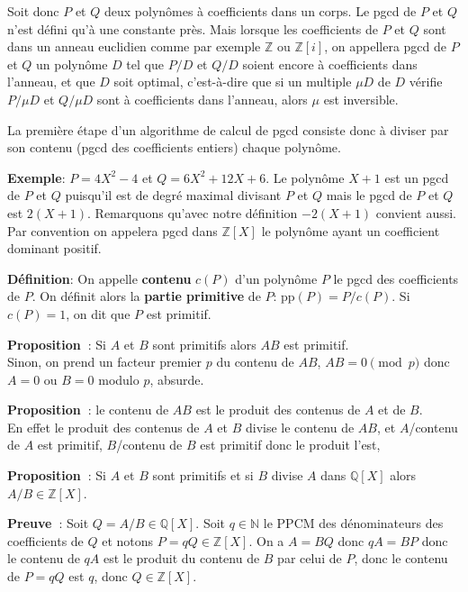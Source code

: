 \documentclass[a4paper,11pt]{article}
\begin{document}
\begin{giacjshere}
Soit donc $ P$ et $Q$ deux polynômes à coefficients dans un corps. Le
pgcd de $P$ et $Q$ n'est défini qu'à une constante près. Mais lorsque les
coefficients de $P$ et $Q$ sont dans un anneau euclidien comme par exemple
$\mathbb{Z}$ ou
$\mathbb{Z}[ i ]$, on appellera pgcd de $P$ et $Q$ un polynôme $D$ tel
que $P / D$ et $Q / D$ soient encore à coefficients dans l'anneau, et que $D$
soit optimal, c'est-à-dire que si un multiple $\mu D$ de $D$ vérifie $P / \mu
D$ et $Q / \mu D$ sont à coefficients dans l'anneau, alors $\mu$ est
inversible. 

La première étape d'un algorithme de calcul de pgcd consiste donc
à diviser par son contenu (pgcd des coefficients entiers) chaque polynôme.

{\bf{Exemple}}: $P = 4 X^2 - 4$ et $Q = 6 X^2 + 12 X + 6$. Le polynôme
$X + 1$ est un pgcd de $P$ et $Q$ puisqu'il est de degré maximal divisant $P$
et $Q$ mais le pgcd de $P$ et $Q$ est $2 ( X + 1 )$. Remarquons qu'avec notre
définition $- 2 ( X + 1 )$ convient aussi. Par convention on appelera
pgcd dans $\mathbb{Z}[X]$ le
polynôme ayant un coefficient dominant positif.

{\bf{Définition}}: On appelle {\bf contenu} $c ( P )$ d'un polynôme $P$ le
pgcd des coefficients de $P$. On définit alors la 
{\bf partie primitive} de $P$:
pp$( P ) = P / c ( P )$. Si $c(P)=1$, on dit que $P$ est primitif.

{\bf Proposition~}: Si $A$ et $B$ sont primitifs alors $AB$ est
primitif.\\
Sinon, on prend un facteur premier $p$ du contenu de $AB$, 
$AB=0 \pmod p$ donc $A=0$ ou $B=0$ modulo $p$, absurde.

{\bf Proposition~}: le contenu de $AB$ est le produit des contenus
de $A$ et de $B$.\\
En effet le produit des contenus de $A$ et $B$ divise le contenu de $AB$,
et $A$/contenu de $A$ est primitif, $B$/contenu de $B$ est primitif
donc le produit l'est,

{\bf Proposition~}: Si $A$ et $B$ sont primitifs et si $B$ divise $A$
dans $\mathbb{Q}[X]$ alors $A/B \in \mathbb{Z}[X]$.

{\bf Preuve~}: Soit $Q=A/B \in \mathbb{Q}[X]$. Soit $q \in \mathbb{N} $ le PPCM des
d\'enominateurs des coefficients de $Q$ et notons $P=qQ \in \mathbb{Z}[X]$.
On a $A=BQ$ donc $qA=BP$ donc le contenu de $qA$ est le produit 
du contenu de $B$ par celui de $P$, donc le contenu de $P=qQ$ est $q$,
donc $Q \in \mathbb{Z}[X]$.


\end{giacjshere}
\end{document}
